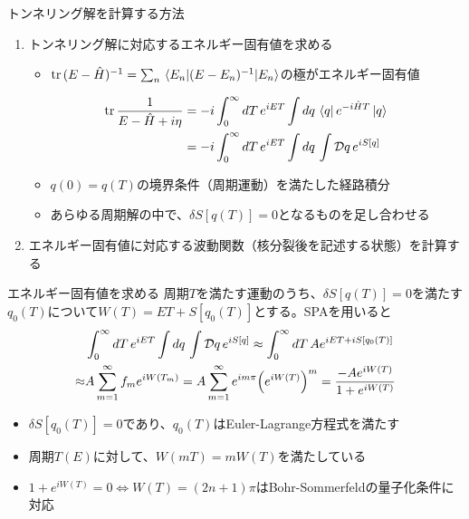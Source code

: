 \documentclass[14pt,aspectratio=169,xcolor=dvipsnames,table,dvipdfmx]{beamer}
\theoremstyle{definition}
\begin{document}
\begin{frame}{トンネリング解を計算する方法}
  \begin{enumerate}
    \item トンネリング解に対応するエネルギー固有値を求める
          \begin{itemize}
            \item $\trace{(E-\hat{H})^{-1}}=\sum_{n}\ev{(E-E_n)^{-1}}{E_n}$の極がエネルギー固有値
          \end{itemize}
          \begin{align*}
            \trace\frac{1}{E-\hat{H}+i\eta} & =-i\int_0^{\infty}dT\,e^{iET}\int dq\,\bra{q}e^{-i\hat{H}T}\ket{q} \\
                                            & = -i\int_0^{\infty}dT\,e^{iET}\int dq\,\int\mathcal{D}q\,e^{iS[q]}
          \end{align*}
          \begin{itemize}
            \item $q(0)=q(T)$の境界条件（周期運動）を満たした経路積分
            \item あらゆる周期解の中で、$\delta S[q(T)]=0$となるものを足し合わせる
          \end{itemize}
  \end{enumerate}
  \begin{enumerate}
    \setcounter{enumi}{1}
    \item エネルギー固有値に対応する波動関数（核分裂後を記述する状態）を計算する
  \end{enumerate}
\end{frame}

\begin{frame}{エネルギー固有値を求める}
  周期$T$を満たす運動のうち、$\delta S[q(T)]=0$を満たす$q_0(T)$について$W(T)=ET+S[q_0(T)]$とする。SPAを用いると
  \begin{align*}
            & \int_0^{\infty}dT\,e^{iET}\int dq\,\int\mathcal{D}q\,e^{iS[q]}
    \approx\int_0^{\infty}dT\,Ae^{iET + iS[q_0(T)]}                                                                                 \\
    \approx & A\sum_{m=1}^{\infty}f_m e^{iW(T_m)} =A\sum_{m=1}^{\infty}e^{im\pi}\qty(e^{iW(T)})^m = \frac{-Ae^{iW(T)}}{1+e^{iW(T)}}
  \end{align*}
  \begin{itemize}
    \item $\delta S[q_0(T)]=0$であり、$q_0(T)$はEuler-Lagrange方程式を満たす
    \item 周期$T(E)$に対して、$W(mT)=mW(T)$を満たしている
    \item $1+e^{iW(T)}=0\Leftrightarrow W(T)=(2n+1)\pi$はBohr-Sommerfeldの量子化条件に対応
  \end{itemize}
\end{frame}
\end{document}
